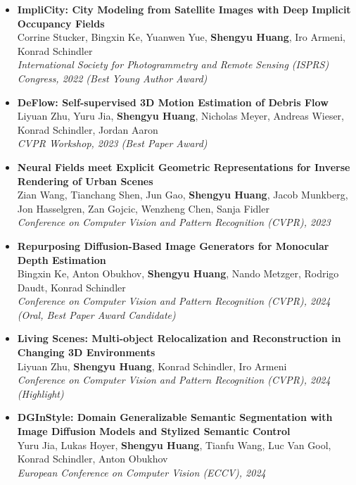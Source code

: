 \begin{itemize}    
    \item \noindent\textbf{ ImpliCity: City Modeling from Satellite Images with Deep Implicit Occupancy Fields} \\[0.5em]
    Corrine Stucker, Bingxin Ke, Yuanwen Yue, \textbf{Shengyu Huang}, Iro Armeni, Konrad Schindler \\
    \textit{International Society for Photogrammetry and Remote Sensing (ISPRS) Congress, 2022 (Best Young Author Award)}
    
    \item \noindent\textbf{ DeFlow: Self-supervised 3D Motion Estimation of Debris Flow} \\[0.5em]
    Liyuan Zhu, Yuru Jia, \textbf{Shengyu Huang}, Nicholas Meyer, Andreas Wieser, Konrad Schindler, Jordan Aaron \\
    \textit{CVPR Workshop, 2023 (Best Paper Award)}
    
    \item \noindent\textbf{ Neural Fields meet Explicit Geometric Representations for Inverse Rendering of Urban Scenes} \\[0.5em]
    Zian Wang, Tianchang Shen, Jun Gao, \textbf{Shengyu Huang}, Jacob Munkberg, Jon Hasselgren, Zan Gojcic, Wenzheng Chen, Sanja Fidler \\
    \textit{Conference on Computer Vision and Pattern Recognition (CVPR), 2023}
    
    \item \noindent\textbf{ Repurposing Diffusion-Based Image Generators for Monocular Depth Estimation} \\[0.5em]
    Bingxin Ke, Anton Obukhov, \textbf{Shengyu Huang}, Nando Metzger, Rodrigo Daudt, Konrad Schindler \\
    \textit{Conference on Computer Vision and Pattern Recognition (CVPR), 2024 (Oral, Best Paper Award Candidate)}
    
    \item \noindent\textbf{ Living Scenes: Multi-object Relocalization and Reconstruction in Changing 3D Environments} \\[0.5em]
    Liyuan Zhu, \textbf{Shengyu Huang}, Konrad Schindler, Iro Armeni \\
    \textit{Conference on Computer Vision and Pattern Recognition (CVPR), 2024 (Highlight)}
    
    \item \noindent\textbf{ DGInStyle: Domain Generalizable Semantic Segmentation with Image Diffusion Models and Stylized Semantic Control} \\[0.5em]
    Yuru Jia, Lukas Hoyer, \textbf{Shengyu Huang}, Tianfu Wang, Luc Van Gool, Konrad Schindler, Anton Obukhov \\
    \textit{European Conference on Computer Vision (ECCV), 2024}
    

\end{itemize}

